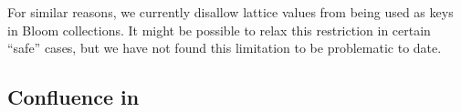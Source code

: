
For similar reasons, we currently disallow lattice values from being used as
keys in Bloom collections. It might be possible to relax this restriction in
certain ``safe'' cases, but we have not found this limitation to be problematic
to date.

\subsection{Confluence in \lang}
